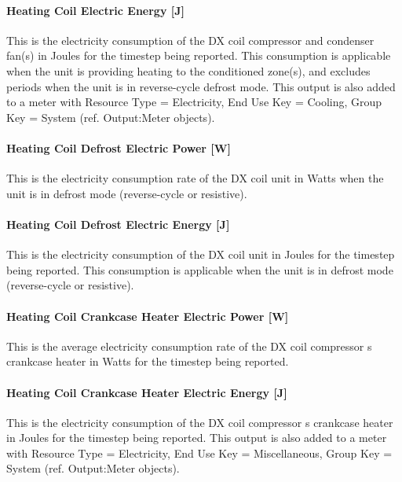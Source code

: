 \paragraph{Heating Coil Electric Energy {[}J{]}}\label{heating-coil-electric-energy-j-3}

This is the electricity consumption of the DX coil compressor and condenser fan(s) in Joules for the timestep being reported. This consumption is applicable when the unit is providing heating to the conditioned zone(s), and excludes periods when the unit is in reverse-cycle defrost mode. This output is also added to a meter with Resource Type = Electricity, End Use Key = Cooling, Group Key = System (ref. Output:Meter objects).

\paragraph{Heating Coil Defrost Electric Power {[}W{]}}\label{heating-coil-defrost-electric-power-w}

This is the electricity consumption rate of the DX coil unit in Watts when the unit is in defrost mode (reverse-cycle or resistive).

\paragraph{Heating Coil Defrost Electric Energy {[}J{]}}\label{heating-coil-defrost-electric-energy-j}

This is the electricity consumption of the DX coil unit in Joules for the timestep being reported. This consumption is applicable when the unit is in defrost mode (reverse-cycle or resistive).

\paragraph{Heating Coil Crankcase Heater Electric Power {[}W{]}}\label{heating-coil-crankcase-heater-electric-power-w}

This is the average electricity consumption rate of the DX coil compressor s crankcase heater in Watts for the timestep being reported.

\paragraph{Heating Coil Crankcase Heater Electric Energy {[}J{]}}\label{heating-coil-crankcase-heater-electric-energy-j}

This is the electricity consumption of the DX coil compressor s crankcase heater in Joules for the timestep being reported. This output is also added to a meter with Resource Type = Electricity, End Use Key = Miscellaneous, Group Key = System (ref. Output:Meter objects).

